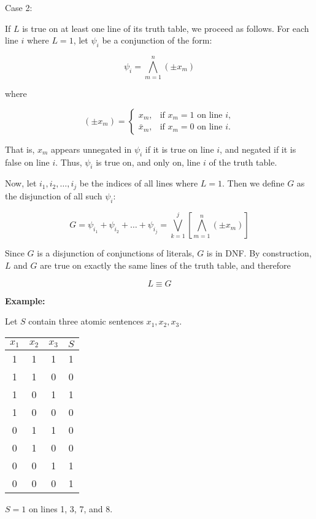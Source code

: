 \documentclass[12pt,a4paper,openany]{article}
\begin{document}
Case 2:

If $L$ is true on at least one line of its truth table, we proceed as
follows. For each line $i$ where $L = 1$, let $\psi_i$ be a
conjunction of the form:

$$\psi_i = \displaystyle\bigwedge_{m=1}^{n} (\pm x_m)$$

where

$$
(\pm x_m) =
\begin{cases}
x_m, & \text{if } x_m = 1 \text{ on line } i, \\
\bar x_m, & \text{if } x_m = 0 \text{ on line } i.
\end{cases}
$$

That is, $x_m$ appears unnegated in $\psi_i$ if it is true on line
$i$, and negated if it is false on line $i$. Thus, $\psi_i$ is
true on, and only on, line $i$ of the truth table.

Now, let $i_1, i_2, \dots, i_j$ be the indices of all lines where
$L = 1$. Then we define $G$ as the disjunction of all such
$\psi_i$:

$$G = \psi_{i_1} + \psi_{i_2} + \dots + \psi_{i_j} = \displaystyle\bigvee_{k=1}^{j} \left[ \bigwedge_{m=1}^{n} (\pm x_m) \right]$$

Since $G$ is a disjunction of conjunctions of literals, $G$ is in
DNF. By construction, $L$ and $G$ are true on exactly the same lines
of the truth table, and therefore

$$L \equiv G$$

\textbf{Example:}

Let $S$ contain three atomic sentences $x_1, x_2, x_3$.

\begin{center}
\begin{tabular}{|c|c|c|c|}
\hline
$x_1$ & $x_2$ & $x_3$ & $S$ \\
\hline
1 & 1 & 1 & 1 \\
\hline
1 & 1 & 0 & 0 \\
\hline
1 & 0 & 1 & 1 \\
\hline
1 & 0 & 0 & 0 \\
\hline
0 & 1 & 1 & 0 \\
\hline
0 & 1 & 0 & 0 \\
\hline
0 & 0 & 1 & 1 \\
\hline
0 & 0 & 0 & 1 \\
\hline
\end{tabular}
\end{center}

$S = 1$ on lines 1, 3, 7, and 8.
\end{document}
